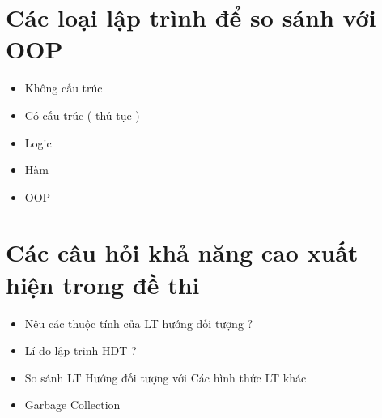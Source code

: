 \documentclass{article}
\begin{document}
\section{Các loại lập trình để so sánh với OOP}
\begin{itemize}
  \item Không cấu trúc
  \item Có cấu trúc ( thủ tục )
  \item Logic
  \item Hàm
  \item OOP
\end{itemize}

\section{Các câu hỏi khả năng cao xuất hiện trong đề thi}
\begin{itemize}
  \item Nêu các thuộc tính của LT hướng đối tượng ?
  \item Lí do lập trình HDT ?
  \item So sánh LT Hướng đối tượng với Các hình thức LT khác
  \item Garbage Collection
\end{itemize}
\end{document}
